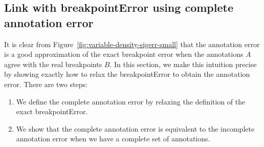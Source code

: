 \documentclass{jsfds} %
\begin{document}
\newpage

\subsection{Link with breakpointError using complete annotation error}
\label{sec:complete}
It is clear from Figure~\ref{fig:variable-density-sigerr-small} that
the annotation error is a good approximation of the exact breakpoint
error when the annotations $A$ agree with the real
breakpoints $B$. In this section, we make this intuition precise by
showing exactly how to relax the breakpointError to obtain the
annotation error. There are two steps:
\begin{enumerate}
\item We define the complete annotation error by relaxing the
  definition of the exact \mbox{breakpointError}.
\item We show that the complete annotation error is equivalent
  to the incomplete annotation error when we have a complete set of
  annotations.
\end{enumerate}


\end{document}
